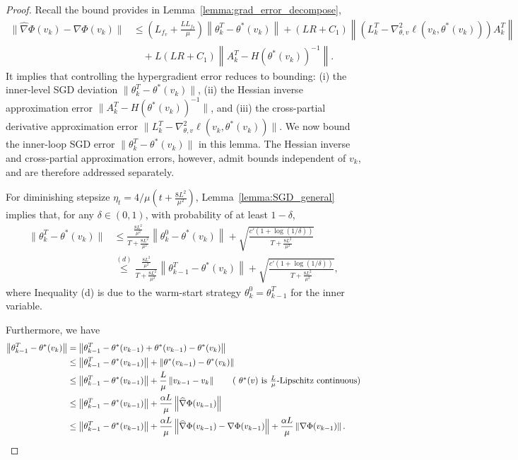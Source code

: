 \documentclass[11 pt]{article}
\begin{document}
\begin{proof}\label{app:proof_grad_error}
Recall the bound provides in Lemma~\ref{lemma:grad_error_decompose},
\begin{align}
    \|\widehat{\nabla}\Phi(v_k)-\nabla\Phi(v_k)\|&\leq\left(L_{f_v}+\frac{LL_{f_\theta}}{\mu} \right)\left\| \theta_k^T-\theta^*(v_k) \right\| + (LR+C_1)\left \|\left(L_k^T - \nabla_{\theta,v}^2\ell(v_k,\theta^*(v_k))
    \right) A_k^T \right\| \nonumber\\
    &\quad +  L(LR+C_1) \left\| A_k^T -  H(\theta^*(v_k))^{-1} \right\|\label{eq:grad_to_theta}.
\end{align}
It implies that controlling the hypergradient error reduces to bounding:  
(i) the inner-level SGD deviation $\|\theta_k^{T} - \theta^*(v_k)\|$,  
(ii) the Hessian inverse approximation error $\|A_k^{T} - H(\theta^*(v_k))^{-1}\|$, 
and (iii) the cross-partial derivative approximation error  
$\|L_k^{T} - \nabla_{\theta,v}^2\ell(v_k,\theta^*(v_k))\|$. We now bound the inner-loop SGD error $\|\theta_k^T-\theta^*(v_k)\|$ in this lemma. The Hessian inverse and cross-partial approximation errors, however, admit bounds independent of $v_k$, and
are therefore addressed separately. 

For diminishing stepsize $\eta_t = 4/{\mu(t+\frac{8L^2}{\mu^2})}$, Lemma~\ref{lemma:SGD_general} implies that, for any $\delta\in(0,1)$, with probability of at least $1-\delta$,
\begin{align}
    \|\theta_k^T - \theta^*(v_k)\| 
    &\leq \frac{\frac{8L^2}{\mu^2}}{T+\frac{8L^2}{\mu^2}}\left\| \theta_k^{0} - \theta^*(v_k)\right\| + \sqrt{\frac{c'(1+\log(1/\delta))}{T+\frac{8L^2}{\mu^2}}}\nonumber\\
    & \overset{(d)}{\leq} \frac{\frac{8L^2}{\mu^2}}{T+\frac{8L^2}{\mu^2}}\left\| \theta_{k-1}^{T} - \theta^*(v_k)\right\| + \sqrt{\frac{c'(1+\log(1/\delta))}{T+\frac{8L^2}{\mu^2}}}\label{eq:thm4_theta_connect},
\end{align}
where Inequality (d) is due to the warm-start strategy $\theta_k^0=\theta_{k-1}^T$ for the inner variable.

Furthermore, we have
\begin{align}
    \left\| \theta_{k-1}^{T} - \theta^*(v_k)\right\|&=\left\| \theta_{k-1}^{T} - \theta^*(v_{k-1})+\theta^*(v_{k-1})-\theta^*(v_k)\right\| \nonumber\\
    &\leq \left\|\theta_{k-1}^{T} - \theta^*(v_{k-1}) \right\|  +  \left\|\theta^*(v_{k-1}) - \theta^*(v_k) \right\| \nonumber\\
    &\leq \left\|\theta_{k-1}^{T} - \theta^*(v_{k-1}) \right\|  +  \frac{L}{\mu}\left\|v_{k-1}-v_k\right\| \tag{ $\theta^*(v)$ is $\frac{L}{\mu}$-Lipschitz continuous}\\
    &\leq \left\|\theta_{k-1}^{T} - \theta^*(v_{k-1}) \right\|  +  \frac{\alpha L}{\mu}\left\| \widehat{\nabla}\Phi(v_{k-1}) \right\| \nonumber\\
    & \leq  \left\|\theta_{k-1}^{T} - \theta^*(v_{k-1}) \right\|  +  \frac{\alpha L}{\mu}\left\| \widehat{\nabla}\Phi(v_{k-1})-\nabla\Phi(v_{k-1})\right\|  + \frac{\alpha L}{\mu} \left\| \nabla\Phi(v_{k-1}) \right\|. \label{eq:theta_kk-1}
\end{align}


\end{proof}
\end{document}
